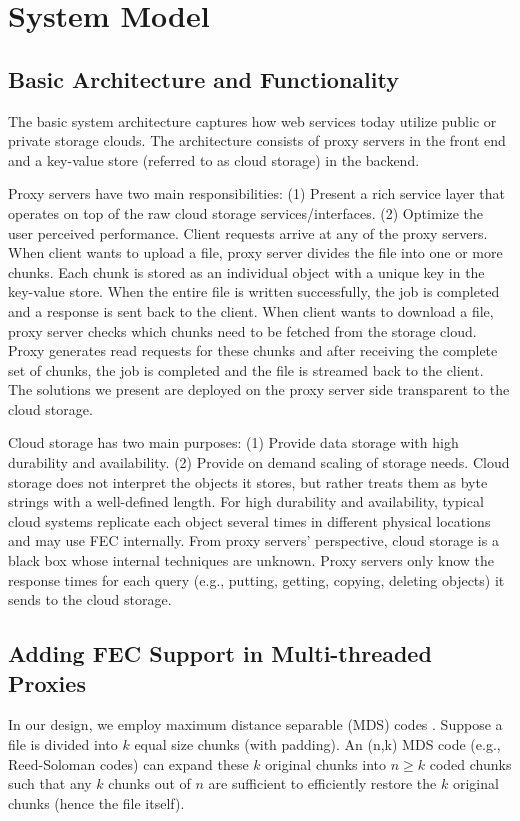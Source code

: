 \documentclass[journal]{IEEEtran}
\begin{document}
\section{System Model}
\label{sec:system}



\subsection{Basic Architecture and Functionality}
The basic system architecture captures how web services today utilize public or private storage clouds.  The architecture consists of proxy servers in the front end and a key-value store (referred to as cloud storage) in the backend. 

Proxy servers have two main responsibilities: (1) Present a rich service layer  that operates on top of the raw cloud storage services/interfaces. (2) Optimize the user perceived performance. Client requests arrive at any of the proxy servers. When client wants to upload a file, proxy server divides the file into one or more chunks. Each chunk is stored as an individual object with a unique key in the key-value store. When the entire file is written successfully, the job is completed and a response is sent back to the client.  When client wants to download a file, proxy server checks which chunks need to be fetched from the storage cloud. Proxy generates read requests for these chunks and after receiving the complete set of chunks, the job is completed and the file is streamed back to the client. The solutions we present are deployed on the proxy server side transparent to the cloud storage.

Cloud storage has two main purposes: (1) Provide data storage with high durability and availability. (2) Provide on demand scaling of storage needs. Cloud storage does not interpret the objects it stores, but rather treats them as byte strings with a well-defined length. For high durability and availability, typical cloud systems replicate each object several times in different physical locations and may use FEC internally. From proxy servers' perspective, cloud storage is a black box whose internal techniques are unknown. Proxy servers only know the response times for each query (e.g., putting, getting, copying, deleting objects) it sends to the cloud storage.

\subsection{Adding FEC Support in Multi-threaded Proxies}
In our design, we employ maximum distance separable (MDS) codes \cite{lincostello}. Suppose a file is divided into $k$ equal size chunks (with padding). An (n,k) MDS code (e.g., Reed-Soloman codes) can expand these $k$ original chunks into $n\ge k$ coded chunks such that any $k$ chunks out of $n$ are sufficient to efficiently restore the $k$ original chunks (hence the file itself). 
\end{document}
